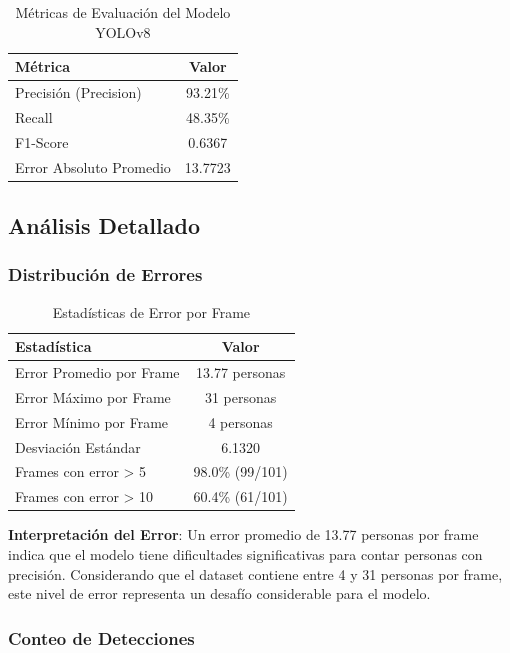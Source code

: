 \documentclass[12pt,a4paper]{article}
\begin{document}
\begin{table}[H]
\centering
\caption{Métricas de Evaluación del Modelo YOLOv8}
\begin{tabular}{@{}lc@{}}
\toprule
\textbf{Métrica} & \textbf{Valor} \\
\midrule
Precisión (Precision) & 93.21\% \\
Recall & 48.35\% \\
F1-Score & 0.6367 \\
Error Absoluto Promedio & 13.7723 \\
\bottomrule
\end{tabular}
\end{table}

\subsection{Análisis Detallado}

\subsubsection{Distribución de Errores}

\begin{table}[H]
\centering
\caption{Estadísticas de Error por Frame}
\begin{tabular}{@{}lc@{}}
\toprule
\textbf{Estadística} & \textbf{Valor} \\
\midrule
Error Promedio por Frame & 13.77 personas \\
Error Máximo por Frame & 31 personas \\
Error Mínimo por Frame & 4 personas \\
Desviación Estándar & 6.1320 \\
Frames con error > 5 & 98.0\% (99/101) \\
Frames con error > 10 & 60.4\% (61/101) \\
\bottomrule
\end{tabular}
\end{table}

\textbf{Interpretación del Error}: Un error promedio de 13.77 personas por frame indica que el modelo tiene dificultades significativas para contar personas con precisión. Considerando que el dataset contiene entre 4 y 31 personas por frame, este nivel de error representa un desafío considerable para el modelo.

\subsubsection{Conteo de Detecciones}
\end{document}
